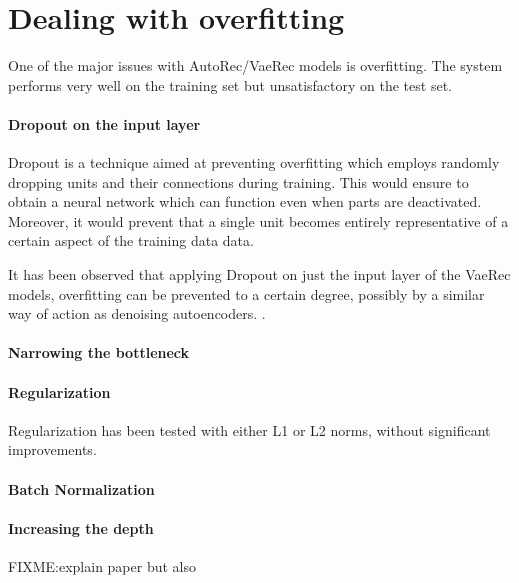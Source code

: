 \section{Dealing with overfitting}

One of the major issues with AutoRec/VaeRec models
is overfitting. The system performs very well on the training
set but unsatisfactory on the test set.

\paragraph{Dropout on the input layer}
Dropout \cite{Srivastava2014}
is a technique aimed at preventing overfitting
which employs randomly dropping units
and their connections
during training.
This would ensure to obtain a neural network
which can function even when parts are deactivated.
Moreover, it would prevent that a single unit becomes
entirely representative of a certain aspect of the training data
data.

It has been observed that applying Dropout on just the input layer
of the VaeRec models,
overfitting can be prevented to a certain degree,
possibly by a similar way of action as denoising autoencoders.
\cite{Vincent2010}.

\paragraph{Narrowing the bottleneck}
\paragraph{Regularization}
Regularization has been tested with either L1 or L2 norms,
without significant improvements.
\paragraph{Batch Normalization}
\paragraph{Increasing the depth}
FIXME:explain paper \cite{MhaskarLP17} but also \cite{Poggio2015}
